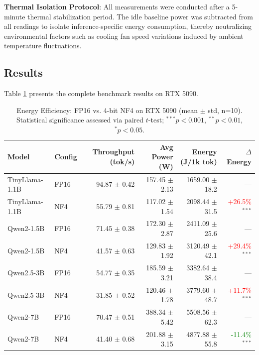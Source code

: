 \documentclass[11pt]{article}
\begin{document}
\noindent\textbf{Thermal Isolation Protocol}: All measurements were conducted after a 5-minute thermal stabilization period. The idle baseline power was subtracted from all readings to isolate inference-specific energy consumption, thereby neutralizing environmental factors such as cooling fan speed variations induced by ambient temperature fluctuations.

\subsection{Results}

Table \ref{tab:main_results} presents the complete benchmark results on RTX 5090.

\begin{table}[t]
\centering
\caption{Energy Efficiency: FP16 vs. 4-bit NF4 on RTX 5090 (mean $\pm$ std, n=10). Statistical significance assessed via paired $t$-test; $^{***}p < 0.001$, $^{**}p < 0.01$, $^{*}p < 0.05$.}
\label{tab:main_results}
\begin{tabular}{llrrrr}
\toprule
\textbf{Model} & \textbf{Config} & \textbf{Throughput (tok/s)} & \textbf{Avg Power (W)} & \textbf{Energy (J/1k tok)} & \textbf{$\Delta$ Energy} \\
\midrule
TinyLlama-1.1B & FP16 & 94.87 $\pm$ 0.42 & 157.45 $\pm$ 2.13 & 1659.00 $\pm$ 18.2 & --- \\
TinyLlama-1.1B & NF4 & 55.79 $\pm$ 0.81 & 117.02 $\pm$ 1.54 & 2098.44 $\pm$ 31.5 & \textcolor{red}{+26.5\%}$^{***}$ \\
\midrule
Qwen2-1.5B & FP16 & 71.45 $\pm$ 0.38 & 172.30 $\pm$ 2.87 & 2411.09 $\pm$ 25.6 & --- \\
Qwen2-1.5B & NF4 & 41.57 $\pm$ 0.63 & 129.83 $\pm$ 1.92 & 3120.49 $\pm$ 42.1 & \textcolor{red}{+29.4\%}$^{***}$ \\
\midrule
Qwen2.5-3B & FP16 & 54.77 $\pm$ 0.35 & 185.59 $\pm$ 3.21 & 3382.64 $\pm$ 38.4 & --- \\
Qwen2.5-3B & NF4 & 31.85 $\pm$ 0.52 & 120.46 $\pm$ 1.78 & 3779.60 $\pm$ 48.7 & \textcolor{red}{+11.7\%}$^{***}$ \\
\midrule
Qwen2-7B & FP16 & 70.47 $\pm$ 0.51 & 388.34 $\pm$ 5.42 & 5508.56 $\pm$ 62.3 & --- \\
Qwen2-7B & NF4 & 41.40 $\pm$ 0.68 & 201.88 $\pm$ 3.15 & 4877.88 $\pm$ 55.8 & \textcolor{green}{-11.4\%}$^{***}$ \\
\bottomrule
\end{tabular}
\end{table}
\end{document}
